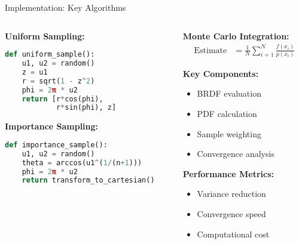 \documentclass[aspectratio=169]{beamer}
\begin{document}
\begin{frame}{Implementation: Key Algorithms}
    \begin{columns}
        \begin{column}{0.5\textwidth}
            \textbf{Uniform Sampling:}
            \begin{lstlisting}[language=Python]
def uniform_sample():
    u1, u2 = random()
    z = u1
    r = sqrt(1 - z^2)
    phi = 2π * u2
    return [r*cos(phi), 
            r*sin(phi), z]
            \end{lstlisting}
            
            \textbf{Importance Sampling:}
            \begin{lstlisting}[language=Python]
def importance_sample():
    u1, u2 = random()
    theta = arccos(u1^(1/(n+1)))
    phi = 2π * u2
    return transform_to_cartesian()
            \end{lstlisting}
        \end{column}
        \begin{column}{0.5\textwidth}
            \textbf{Monte Carlo Integration:}
            \begin{align}
                \text{Estimate} &= \frac{1}{N} \sum_{i=1}^{N} \frac{f(x_i)}{p(x_i)}
            \end{align}
            
            \textbf{Key Components:}
            \begin{itemize}
                \item BRDF evaluation
                \item PDF calculation
                \item Sample weighting
                \item Convergence analysis
            \end{itemize}
            
            \vspace{0.5cm}
            \textbf{Performance Metrics:}
            \begin{itemize}
                \item Variance reduction
                \item Convergence speed
                \item Computational cost
            \end{itemize}
        \end{column}
    \end{columns}
\end{frame}
\end{document}
